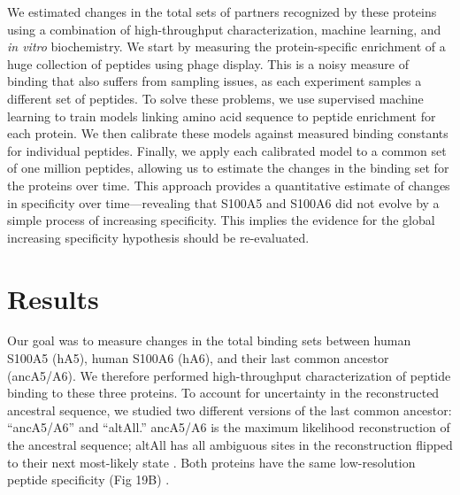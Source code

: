 We estimated changes in the total sets of partners recognized by these
proteins using a combination of high-throughput characterization,
machine learning, and \textit{in vitro} biochemistry. We start by
measuring the protein-specific enrichment of a huge collection of
peptides using phage display. This is a noisy measure of binding that
also suffers from sampling issues, as each experiment samples a different
set of peptides. To solve these problems, we use supervised machine
learning to train models linking amino acid sequence to peptide enrichment
for each protein. We then calibrate these models against measured
binding constants for individual peptides. Finally, we apply each
calibrated model to a common set of one million peptides, allowing
us to estimate the changes in the binding set for the proteins over
time. This approach provides a quantitative estimate of changes in
specificity over time---revealing that S100A5 and S100A6 did not evolve
by a simple process of increasing specificity. This implies the evidence
for the global increasing specificity hypothesis should be re-evaluated. 

\section{Results}

Our goal was to measure changes in the total binding sets between
human S100A5 (hA5), human S100A6 (hA6), and their last common ancestor
(ancA5/A6). We therefore performed high-throughput characterization
of peptide binding to these three proteins. To account for uncertainty
in the reconstructed ancestral sequence, we studied two different
versions of the last common ancestor: ``ancA5/A6'' and ``altAll.''
ancA5/A6 is the maximum likelihood reconstruction of the ancestral
sequence; altAll has all ambiguous sites in the reconstruction flipped
to their next most-likely state \citep{eick_robustness_2017,wheeler_conservation_2017}.
Both proteins have the same low-resolution peptide specificity (Fig
19B) \citep{wheeler_conservation_2017}. 

